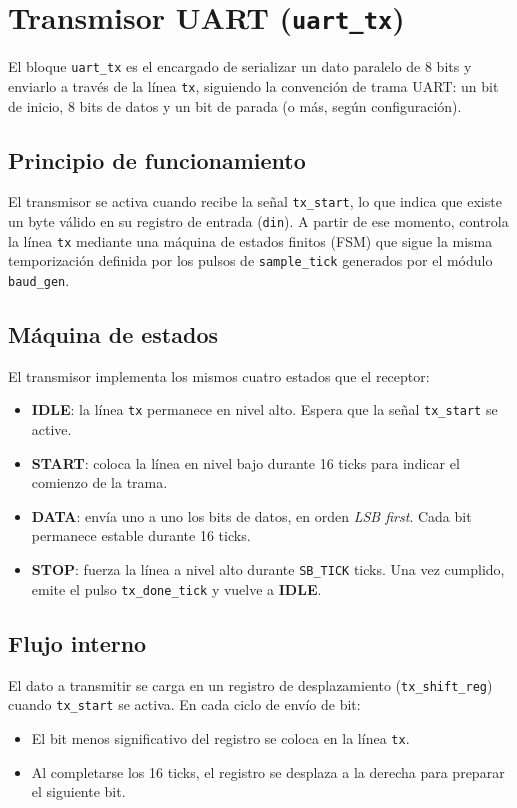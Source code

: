 \section{Transmisor UART (\texttt{uart\_tx})}

El bloque \texttt{uart\_tx} es el encargado de serializar un dato paralelo de 8 bits y enviarlo a través de la línea \texttt{tx}, siguiendo la convención de trama UART: un bit de inicio, 8 bits de datos y un bit de parada (o más, según configuración).

\subsection{Principio de funcionamiento}
El transmisor se activa cuando recibe la señal \texttt{tx\_start}, lo que indica que existe un byte válido en su registro de entrada (\texttt{din}). A partir de ese momento, controla la línea \texttt{tx} mediante una máquina de estados finitos (FSM) que sigue la misma temporización definida por los pulsos de \texttt{sample\_tick} generados por el módulo \texttt{baud\_gen}.

\subsection{Máquina de estados}
El transmisor implementa los mismos cuatro estados que el receptor:
\begin{itemize}
    \item \textbf{IDLE}: la línea \texttt{tx} permanece en nivel alto. Espera que la señal \texttt{tx\_start} se active.
    \item \textbf{START}: coloca la línea en nivel bajo durante 16 ticks para indicar el comienzo de la trama.
    \item \textbf{DATA}: envía uno a uno los bits de datos, en orden \textit{LSB first}. Cada bit permanece estable durante 16 ticks.
    \item \textbf{STOP}: fuerza la línea a nivel alto durante \texttt{SB\_TICK} ticks. Una vez cumplido, emite el pulso \texttt{tx\_done\_tick} y vuelve a \textbf{IDLE}.
\end{itemize}

\subsection{Flujo interno}
El dato a transmitir se carga en un registro de desplazamiento (\texttt{tx\_shift\_reg}) cuando \texttt{tx\_start} se activa.  
En cada ciclo de envío de bit:
\begin{itemize}
    \item El bit menos significativo del registro se coloca en la línea \texttt{tx}.
    \item Al completarse los 16 ticks, el registro se desplaza a la derecha para preparar el siguiente bit.
\end{itemize}

